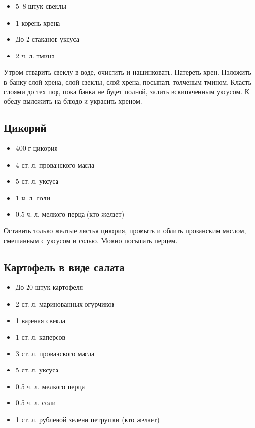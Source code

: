 \begin{itemize}
	\item 5–8 штук свеклы 
    \item 1 корень хрена 
    \item До 2 стаканов уксуса 
    \item 2 ч. л. тмина
\end{itemize}

Утром отварить свеклу в воде, очистить и нашинковать. Натереть хрен. Положить в банку слой хрена, слой свеклы, слой хрена, посыпать толченым тмином. Класть слоями до тех пор, пока банка не будет полной, залить вскипяченным уксусом. К обеду выложить на блюдо и украсить хреном.

\subsection{Цикорий}

\begin{itemize}
	\item 400 г цикория 
    \item 4 ст. л. прованского масла 
    \item 5 ст. л. уксуса 
    \item 1 ч. л. соли 
    \item 0.5 ч. л. мелкого перца (кто желает)
\end{itemize}

Оставить только желтые листья цикория, промыть и облить прованским маслом, смешанным с уксусом и солью. Можно посыпать перцем.

\subsection{Картофель в виде салата}

\begin{itemize}
	\item До 20 штук картофеля 
    \item 2 ст. л. маринованных огурчиков 
    \item 1 вареная свекла 
    \item 1 ст. л. каперсов 
    \item 3 ст. л. прованского масла 
    \item 5 ст. л. уксуса 
    \item 0.5 ч. л. мелкого перца 
    \item 0.5 ч. л. соли 
    \item 1 ст. л. рубленой зелени петрушки (кто желает)
\end{itemize}


